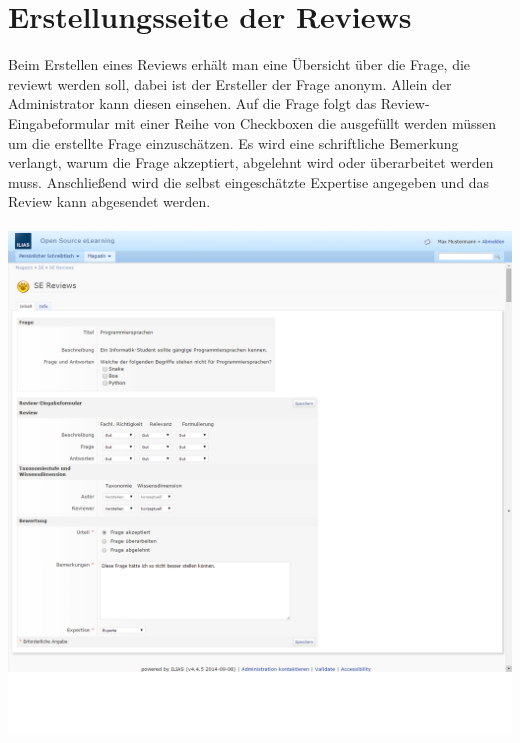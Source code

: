 \documentclass[12pt,a4paper]{scrreprt}
\begin{document}
\section{Erstellungsseite der Reviews}
Beim Erstellen eines Reviews erhält man eine Übersicht über die Frage, die reviewt werden soll, dabei ist der Ersteller der Frage anonym. Allein der Administrator kann diesen einsehen.
Auf die Frage folgt das Review-Eingabeformular mit einer Reihe von Checkboxen die ausgefüllt werden müssen um die erstellte Frage einzuschätzen. Es wird eine schriftliche Bemerkung verlangt, warum die Frage akzeptiert, abgelehnt wird oder überarbeitet werden muss.
Anschließend wird die selbst eingeschätzte Expertise angegeben und das Review kann abgesendet werden.\\
\\
\includegraphics[width=1.0\textwidth]{reviewformular.png}
\end{document}
